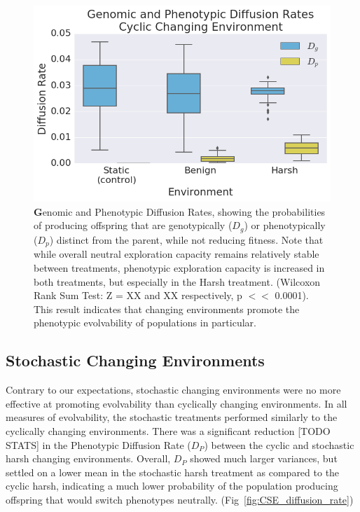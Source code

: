 \documentclass[PhD]{msu-thesis}
\begin{document}
\begin{figure}[!h] %
\includegraphics[trim={0.2cm 0 0.4cm 0.25cm},clip,width=0.75\columnwidth]{figures/CE/CCE_D_g_D_p__box.png}
\caption{{\textbf Genomic and Phenotypic Diffusion Rates}, showing the probabilities of producing offspring that are genotypically ($D_g$) or phenotypically ($D_p$) distinct from the parent, while not reducing fitness.
Note that while overall neutral exploration capacity remains relatively stable between treatments, phenotypic exploration capacity is increased in both treatments, but especially in the Harsh treatment. (Wilcoxon Rank Sum Test: Z = XX and XX respectively, p $<<$ 0.0001). This result indicates that changing environments promote the phenotypic evolvability of populations in particular.
}\label{fig:CCE_diffusion_rate}
\end{figure}




\subsection{Stochastic Changing Environments}
Contrary to our expectations, stochastic changing environments were no more effective at promoting evolvability than cyclically changing environments. In all measures of evolvability, the stochastic treatments performed similarly to the cyclically changing environments. There was a significant reduction [TODO STATS] in the Phenotypic Diffusion Rate ($D_P$) between the cyclic and stochastic harsh changing environments. Overall, $D_P$ showed much larger variances, but settled on a lower mean in the stochastic harsh treatment as compared to the cyclic harsh, indicating a much lower probability of the population producing offspring that would switch phenotypes neutrally. (Fig~\ref{fig:CSE_diffusion_rate})
\end{document}
